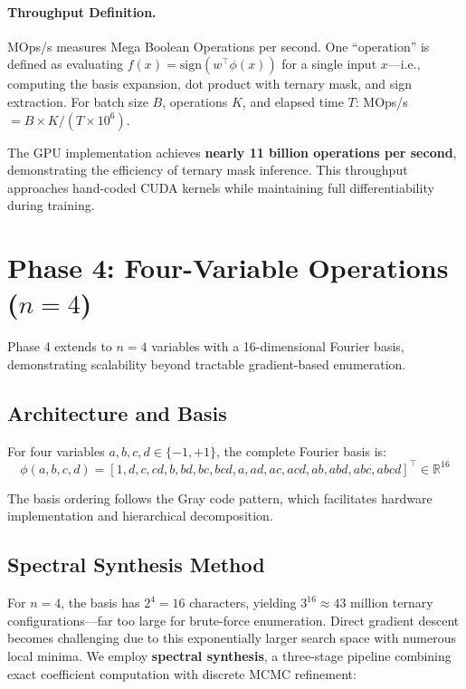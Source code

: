 \documentclass[Royal,times,sageh]{sagej}
\newcommand{\sign}{\text{sign}}
\begin{document}
\paragraph{Throughput Definition.} MOps/s measures Mega Boolean Operations per second. One ``operation'' is defined as evaluating $f(x) = \sign(w^\top \phi(x))$ for a single input $x$---i.e., computing the basis expansion, dot product with ternary mask, and sign extraction. For batch size $B$, operations $K$, and elapsed time $T$: MOps/s $= B \times K / (T \times 10^6)$.

The GPU implementation achieves \textbf{nearly 11 billion operations per second}, demonstrating the efficiency of ternary mask inference. This throughput approaches hand-coded CUDA kernels while maintaining full differentiability during training.

\section{Phase 4: Four-Variable Operations ($n=4$)}
\label{sec:phase4}

Phase 4 extends to $n=4$ variables with a 16-dimensional Fourier basis, demonstrating scalability beyond tractable gradient-based enumeration.

\subsection{Architecture and Basis}

For four variables $a, b, c, d \in \{-1, +1\}$, the complete Fourier basis is:
\begin{equation}
    \phi(a,b,c,d) = [1, d, c, cd, b, bd, bc, bcd, a, ad, ac, acd, ab, abd, abc, abcd]^\top \in \mathbb{R}^{16}
\end{equation}

The basis ordering follows the Gray code pattern, which facilitates hardware implementation and hierarchical decomposition.

\subsection{Spectral Synthesis Method}

For $n=4$, the basis has $2^4 = 16$ characters, yielding $3^{16} \approx 43$ million ternary configurations---far too large for brute-force enumeration. Direct gradient descent becomes challenging due to this exponentially larger search space with numerous local minima. We employ \textbf{spectral synthesis}, a three-stage pipeline combining exact coefficient computation with discrete MCMC refinement:
\end{document}
